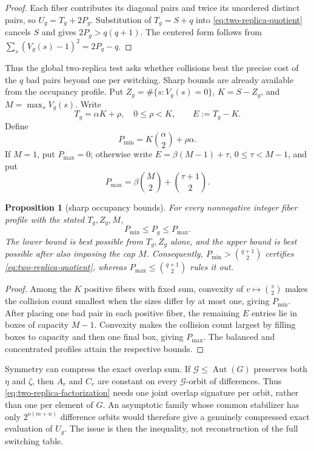 \documentclass[11pt]{article}
\newtheorem{proposition}[theorem]{Proposition}
\theoremstyle{definition}
\theoremstyle{remark}
\begin{document}
\begin{proof}
Each fiber contributes its diagonal pairs and twice its unordered distinct
pairs, so $U_g=T_g+2P_g$.  Substitution of $T_g=S+q$ into
\eqref{eq:two-replica-quotient} cancels $S$ and gives
$2P_g>q(q+1)$.  The centered form follows from
$\sum_s(V_g(s)-1)^2=2P_g-q$.
\end{proof}

Thus the global two-replica test asks whether collisions beat the precise
cost of the $q$ bad pairs beyond one per switching.  Sharp bounds are already
available from the occupancy profile.  Put
$Z_g=\#\{s:V_g(s)=0\}$, $K=S-Z_g$, and $M=\max_sV_g(s)$.  Write
\[
 T_g=\alpha K+\rho,
 \quad 0\le\rho<K,
 \qquad
 E:=T_g-K.
\]
Define
\[
 P_{\min}=K\binom{\alpha}{2}+\rho\alpha.
\]
If $M=1$, put $P_{\max}=0$; otherwise write
$E=\beta(M-1)+\tau$, $0\le\tau<M-1$, and put
\[
 P_{\max}=\beta\binom{M}{2}+\binom{\tau+1}{2}.
\]

\begin{proposition}[sharp occupancy bounds]\label{prop:two-replica-occupancy}
For every nonnegative integer fiber profile with the stated
$T_g,Z_g,M$,
\[
 P_{\min}\le P_g\le P_{\max}.
\]
The lower bound is best possible from $T_g,Z_g$ alone, and the upper bound is
best possible after also imposing the cap $M$.  Consequently,
$P_{\min}>\binom{q+1}{2}$ certifies
\eqref{eq:two-replica-quotient}, whereas
$P_{\max}\le\binom{q+1}{2}$ rules it out.
\end{proposition}

\begin{proof}
Among the $K$ positive fibers with fixed sum, convexity of
$v\mapsto\binom v2$ makes the collision count smallest when the sizes differ
by at most one, giving $P_{\min}$.  After placing one bad pair in each
positive fiber, the remaining $E$ entries lie in boxes of capacity $M-1$.
Convexity makes the collision count largest by filling boxes to capacity and
then one final box, giving $P_{\max}$.  The balanced and concentrated profiles
attain the respective bounds.
\end{proof}

Symmetry can compress the exact overlap sum.  If
$\mathcal G\le\operatorname{Aut}(G)$ preserves both $\eta$ and $\zeta$, then
$A_r$ and $C_r$ are constant on every $\mathcal G$-orbit of differences.
Thus \eqref{eq:two-replica-factorization} needs one joint overlap signature
per orbit, rather than one per element of $G$.  An asymptotic family whose
common stabilizer has only $2^{o(m+n)}$ difference orbits would therefore
give a genuinely compressed exact evaluation of $U_g$.  The issue is then
the inequality, not reconstruction of the full switching table.
\end{document}
